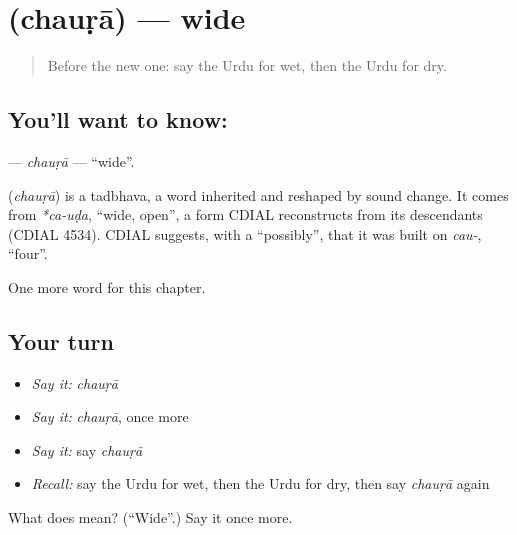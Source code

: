 \section[\texorpdfstring{\ur{چوڑا} (chauṛā)}{چوڑا (chauṛā)}]{ (chauṛā) — wide}

\label{lesson:UR-C134-chaura}



\begin{quote}
Before the new one: say the Urdu for wet, then the Urdu for dry.
\end{quote}

\subsection*{You'll want to know: }
\textbf{} — \emph{chauṛā} — \textquotedblleft{}wide\textquotedblright{}.

\begin{cousinweb}
\textbf{} (\emph{chauṛā}) is a tadbhava, a word inherited and reshaped by sound change. It comes from \emph{*ca-uḍa}, \textquotedblleft{}wide, open\textquotedblright{}, a form CDIAL reconstructs from its descendants (CDIAL 4534). CDIAL suggests, with a \textquotedblleft{}possibly\textquotedblright{}, that it was built on \emph{cau-}, \textquotedblleft{}four\textquotedblright{}.
\end{cousinweb}

\begin{grammarlens}[title={What you've built}]
One more word for this chapter.
\end{grammarlens}

\subsection*{Your turn}
\begin{itemize}
\raggedright
  \item \emph{Say it:} \emph{chauṛā}
  \item \emph{Say it:} \emph{chauṛā}, once more
  \item \emph{Say it:} say \emph{chauṛā}
  \item \emph{Recall:} say the Urdu for wet, then the Urdu for dry, then say \emph{chauṛā} again
\end{itemize}

\begin{tcolorbox}[breakable,colback=teal!4,colframe=teal!35!black,title={Before you move on}]
What does  mean? (\textquotedblleft{}Wide\textquotedblright{}.) Say it once more.
\end{tcolorbox}

